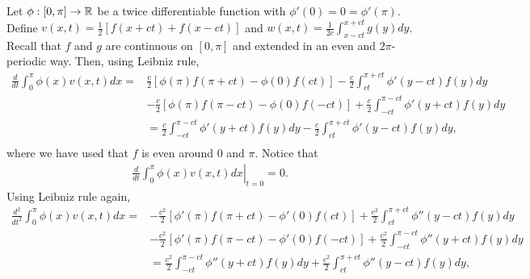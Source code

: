 \begin{questions}
\begin{solution}
Let $\phi:[0,\pi]\rightarrow\mathbb{R}$ be a twice differentiable function with $\phi'(0)=0=\phi'(\pi)$. Define $v(x,t)=\frac{1}{2}\left[f(x+ct)+f(x-ct)\right]$ and $w(x,t)=\frac{1}{2c}\int_{x-ct}^{x+ct}g(y)dy$. Recall that $f$ and $g$ are continuous on $[0,\pi]$ and extended in an even and $2\pi$-periodic way. Then, using Leibniz rule,
\begin{align*}
\frac{d}{dt}\int_0^\pi\phi(x)v(x,t)dx=&\frac{c}{2}\left[\phi(\pi)f(\pi+ct)-\phi(0)f(ct)\right]-\frac{c}{2}\int_{ct}^{\pi+ct}\phi'(y-ct)f(y)dy\\
&-\frac{c}{2}\left[\phi(\pi)f(\pi-ct)-\phi(0)f(-ct)\right]+\frac{c}{2}\int_{-ct}^{\pi-ct}\phi'(y+ct)f(y)dy\\
&=\frac{c}{2}\int_{-ct}^{\pi-ct}\phi'(y+ct)f(y)dy-\frac{c}{2}\int_{ct}^{\pi+ct}\phi'(y-ct)f(y)dy,\\
\end{align*}
where we have used that $f$ is even around $0$ and $\pi$. Notice that 
\begin{align*}
\left.\frac{d}{dt}\int_0^\pi\phi(x)v(x,t)dx\right|_{t=0}=0.
\end{align*}
Using Leibniz rule again,
\begin{align*}
\frac{d^2}{dt^2}\int_0^\pi\phi(x)v(x,t)dx=&-\frac{c^2}{2}\left[\phi'(\pi)f(\pi+ct)-\phi'(0)f(ct)\right]+\frac{c^2}{2}\int_{ct}^{\pi+ct}\phi''(y-ct)f(y)dy\\
&-\frac{c^2}{2}\left[\phi'(\pi)f(\pi-ct)-\phi'(0)f(-ct)\right]+\frac{c^2}{2}\int_{-ct}^{\pi-ct}\phi''(y+ct)f(y)dy\\
&=\frac{c^2}{2}\int_{-ct}^{\pi-ct}\phi''(y+ct)f(y)dy+\frac{c^2}{2}\int_{ct}^{\pi+ct}\phi''(y-ct)f(y)dy,\\

\end{align*}
\end{solution}
\end{questions}
